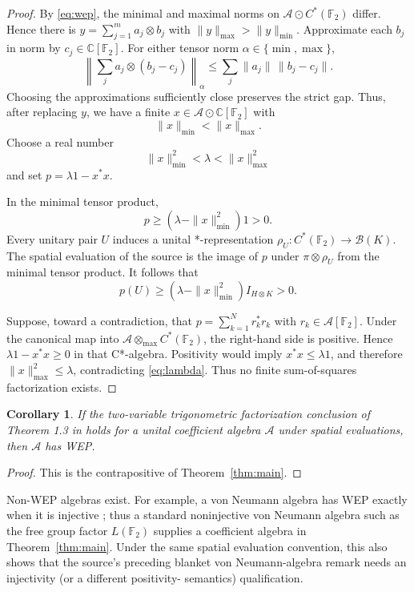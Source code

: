 \documentclass[11pt]{article}
\newtheorem{corollary}{Corollary}
\newcommand{\A}{\mathcal A}
\newcommand{\F}{\mathbb F}
\newcommand{\C}{\mathbb C}
\newcommand{\otmax}{\otimes_{\max}}
\begin{document}
\begin{proof}
By \eqref{eq:wep}, the minimal and maximal norms on
$\A\odot C^*(\F_2)$ differ.  Hence there is
$y=\sum_{j=1}^m a_j\otimes b_j$ with
$\|y\|_{\max}>\|y\|_{\min}$.  Approximate each $b_j$ in norm by
$c_j\in\C[\F_2]$.  For either tensor norm $\alpha\in\{\min,\max\}$,
\[
 \left\|\sum_j a_j\otimes(b_j-c_j)\right\|_\alpha
 \le \sum_j\|a_j\|\,\|b_j-c_j\|.
\]
Choosing the approximations sufficiently close preserves the strict gap.
Thus, after replacing $y$, we have a finite
$x\in\A\odot\C[\F_2]$ with
\begin{equation}\label{eq:gap}
 \|x\|_{\min}<\|x\|_{\max}.
\end{equation}
Choose a real number
\begin{equation}\label{eq:lambda}
 \|x\|_{\min}^2<\lambda<\|x\|_{\max}^2
\end{equation}
and set $p=\lambda1-x^*x$.

In the minimal tensor product,
\[
 p\ge(\lambda-\|x\|_{\min}^2)1>0.
\]
Every unitary pair $U$ induces a unital *-representation
$\rho_U:C^*(\F_2)\to\mathcal B(K)$.  The spatial evaluation of the source is
the image of $p$ under $\pi\otimes\rho_U$ from the minimal tensor product.
It follows that
\[
 p(U)\ge(\lambda-\|x\|_{\min}^2)I_{H\otimes K}>0.
\]

Suppose, toward a contradiction, that
$p=\sum_{k=1}^N r_k^*r_k$ with $r_k\in\A[\F_2]$.  Under the canonical map
into $\A\otmax C^*(\F_2)$, the right-hand side is positive.  Hence
$\lambda1-x^*x\ge0$ in that C*-algebra.  Positivity would imply
$x^*x\le\lambda1$, and therefore
$\|x\|_{\max}^2\le\lambda$, contradicting \eqref{eq:lambda}.  Thus no finite
sum-of-squares factorization exists.
\end{proof}

\begin{corollary}\label{cor:wep}
If the two-variable trigonometric factorization conclusion of Theorem 1.3 in
\cite{JKM} holds for a unital coefficient algebra $\A$ under spatial
evaluations, then $\A$ has WEP.
\end{corollary}

\begin{proof}
This is the contrapositive of Theorem~\ref{thm:main}.
\end{proof}

Non-WEP algebras exist.  For example, a von Neumann algebra has WEP exactly
when it is injective \cite[Corollary 6.2]{FKP}; thus a standard noninjective
von Neumann algebra such as the free group factor $L(\F_2)$ supplies a
coefficient algebra in Theorem~\ref{thm:main}.  Under the same spatial
evaluation convention, this also shows that the source's preceding blanket
von Neumann-algebra remark needs an injectivity (or a different positivity-
semantics) qualification.
\end{document}

